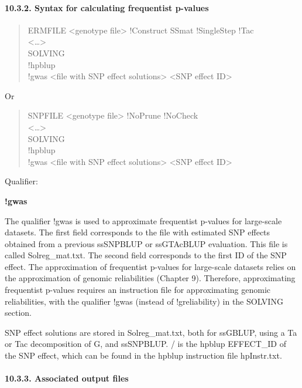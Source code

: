 \paragraph{10.3.2. Syntax for calculating frequentist
p-values}\label{MTGW10}

\begin{quote}
ERMFILE \textless genotype file\textgreater{} !Construct SSmat
!SingleStep !Tac\\
\textless\ldots\textgreater{}\\
SOLVING\\
!hpblup\\
!gwas \textless file with SNP effect solutions\textgreater{}
\textless SNP effect ID\textgreater{}
\end{quote}

Or

\begin{quote}
SNPFILE \textless genotype file\textgreater{} !NoPrune !NoCheck\\
\textless\ldots\textgreater{}\\
SOLVING\\
!hpblup\\
!gwas \textless file with SNP effect solutions\textgreater{}
\textless SNP effect ID\textgreater{}
\end{quote}

Qualifier:

\textbf{!gwas }

The qualifier !gwas is used to approximate frequentist p-values for
large-scale datasets. The first field corresponds to the file with
estimated SNP effects obtained from a previous ssSNPBLUP or ssGTAcBLUP
evaluation. This file is called Solreg\_mat.txt. The second field
corresponds to the first ID of the SNP effect. The approximation of
frequentist p-values for large-scale datasets relies on the
approximation of genomic reliabilities (Chapter 9). Therefore,
approximating frequentist p-values requires an instruction file for
approximating genomic reliabilities, with the qualifier !gwas (instead
of !greliability) in the SOLVING section.

SNP effect solutions are stored in Solreg\_mat.txt, both for ssGBLUP,
using a Ta or Tac decomposition of G, and ssSNPBLUP. / is the hpblup
EFFECT\_ID of the SNP effect, which can be found in the hpblup
instruction file hpInstr.txt.

\paragraph{10.3.3. Associated output files}\label{MTGW11}

